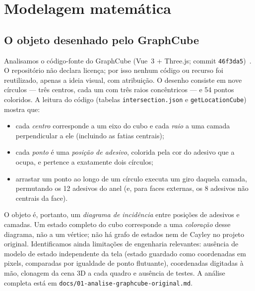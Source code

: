 \section{Modelagem matemática}\label{sec:modelagem}

\subsection{O objeto desenhado pelo GraphCube}\label{sec:graphcube}
Analisamos o código-fonte do GraphCube (Vue~3 + Three.js; commit \texttt{46f3da5})~\cite{laguna2024}. O repositório não declara licença; por isso nenhum código ou recurso foi reutilizado, apenas a ideia visual, com atribuição. O desenho consiste em nove círculos --- três centros, cada um com três raios concêntricos --- e 54 pontos coloridos. A leitura do código (tabelas \texttt{intersection.json} e \texttt{getLocationCube}) mostra que:
\begin{itemize}[nosep]
\item cada \emph{centro} corresponde a um eixo do cubo e cada \emph{raio} a uma camada perpendicular a ele (incluindo as fatias centrais);
\item cada \emph{ponto} é uma \emph{posição de adesivo}, colorida pela cor do adesivo que a ocupa, e pertence a exatamente dois círculos;
\item arrastar um ponto ao longo de um círculo executa um giro daquela camada, permutando os 12 adesivos do anel (e, para faces externas, os 8 adesivos não centrais da face).
\end{itemize}
O objeto é, portanto, um \emph{diagrama de incidência} entre posições de adesivos e camadas. Um estado completo do cubo corresponde a uma \emph{coloração} desse diagrama, não a um vértice; não há grafo de estados nem de Cayley no projeto original. Identificamos ainda limitações de engenharia relevantes: ausência de modelo de estado independente da tela (estado guardado como coordenadas em pixels, comparadas por igualdade de ponto flutuante), coordenadas digitadas à mão, clonagem da cena 3D a cada quadro e ausência de testes. A análise completa está em \texttt{docs/01-analise-graphcube-original.md}.

